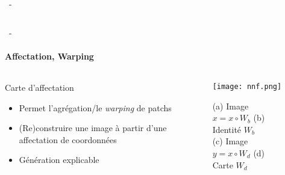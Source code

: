 \documentclass[aspectratio=169, 22pt]{beamer}
\begin{document}
\begin{frame}{\secname~- \subsecname}
\begin{columns}
\begin{column}{0.4\linewidth}
    \end{column}
  \end{columns}  
\end{frame}

\begin{frame}{\secname~- \subsecname} 
  \framesubtitle{Affectation, Warping}
  \begin{columns}
    \begin{column}{0.55\linewidth}
      \begin{exampleblock}{Carte d'affectation}
        \begin{itemize}
        \item Permet l'agrégation/le \emph{warping} de patchs
        \item (Re)construire une image à partir d'une \alert{affectation de coordonnées}
        \item Génération explicable
        \end{itemize}
      \end{exampleblock}
    \end{column}
    \begin{column}{0.45\linewidth}
      \begin{figure}
        \centering
        \texttt{[image: nnf.png]}
        \caption{(a) Image $x = x \circ W_b$ \quad(b) Identité $W_b$
          \\ (c) Image $y = x \circ W_d$ \quad(d) Carte $W_d$}
      \end{figure}
    \end{column}
  \end{columns}
\end{frame}


\end{document}

